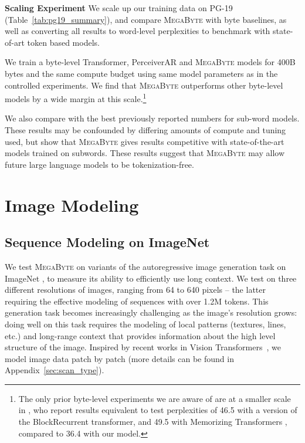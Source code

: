 \documentclass{article}
\newcommand{\fastslow}[0]{\textsc{MegaByte}\xspace}
\newcommand{\megabyte}[0]{\fastslow}
\theoremstyle{plain}
\theoremstyle{definition}
\theoremstyle{remark}
\begin{document}
\textbf{Scaling Experiment} We scale up our training data on PG-19 (Table~\ref{tab:pg19_summary}), and compare \megabyte with byte baselines, as well as converting all results to word-level perplexities to benchmark with state-of-art token based models. 

We train a byte-level Transformer, PerceiverAR and \megabyte models for 400B bytes and the same compute budget using same model parameters as in the controlled experiments. We find that \megabyte outperforms other byte-level models by a wide margin at this scale.\footnote{The only prior byte-level experiments we are aware of are at a smaller scale in \citet{blockrecurrent}, who report results equivalent to test perplexities of 46.5 with a version of the BlockRecurrent transformer, and 49.5 with Memorizing Transformers \cite{memorizing}, compared to 36.4 with our model. } %

We also compare with the best previously reported numbers for sub-word models. These results may be confounded by differing amounts of compute and tuning used, but show that \megabyte %
gives results competitive with state-of-the-art models trained on subwords. These results suggest that \megabyte may allow future large language models to be tokenization-free.



\section{Image Modeling}
\label{sec:image}

\subsection{Sequence Modeling on ImageNet}



We test \megabyte on variants of the autoregressive image generation task on ImageNet \citep{Oord2016PixelNetworks}, to measure its ability to efficiently use long context. We test on three different resolutions of images, ranging from 64 to 640 pixels -- the latter requiring the effective modeling of sequences with over 1.2M tokens. This generation task becomes increasingly challenging as the image's resolution grows: doing well on this task requires the modeling of local patterns (textures, lines, etc.) and long-range context that provides information about the high level structure of the image. Inspired by recent works in Vision Transformers~\citep{vit}, we model image data patch by patch (more details can be found in Appendix~\ref{sec:scan_type}). 
\end{document}
